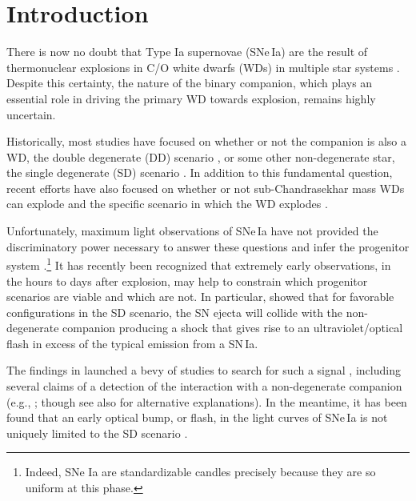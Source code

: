 \documentclass[twocolumn]{aastex63}
\begin{document}
\keywords{}

\section{Introduction}

There is now no doubt that Type Ia supernovae (SNe\,Ia) are the result of
thermonuclear explosions in C/O white dwarfs (WDs) in multiple star systems
\citep[see e.g.,][and references therein]{Maoz14}. Despite this certainty, the
nature of the binary companion, which plays an essential role in driving the
primary WD towards explosion, remains highly uncertain.

Historically, most studies have focused on whether or not the companion is
also a WD, the double degenerate (DD) scenario \citep[e.g.,][]{Webbink84}, or
some other non-degenerate star, the single degenerate (SD) scenario
\citep[e.g.,][]{Whelan73}. In addition to this fundamental question, recent
efforts have also focused on whether or not sub-Chandrasekhar mass WDs can
explode \citep[e.g.,][]{Fink10,Shen14,Scalzo14a,Polin19,Gronow20} and the
specific scenario in which the WD explodes \citep[see][and references
therein]{Hillebrandt13,Ropke18}.

Unfortunately, maximum light observations of SNe\,Ia have not provided the
discriminatory power necessary to answer these questions and infer the
progenitor system \citep[e.g.,][]{Ropke12}.\footnote{Indeed, SNe Ia are
standardizable candles precisely because they are so uniform at this phase.}
It has recently been recognized that extremely early observations, in the
hours to days after explosion, may help to constrain which progenitor
scenarios are viable and which are not. In particular, \citet{Kasen10a} showed
that for favorable configurations in the SD scenario, the SN ejecta will
collide with the non-degenerate companion producing a shock that gives rise to
an ultraviolet/optical flash in excess of the typical emission from a SN\,Ia.

The findings in \citet{Kasen10a} launched a bevy of studies to search for such
a signal \citep[e.g.,][]{Hayden10,Ganeshalingam11,Bianco11,Nugent11,Olling15},
including several claims of a detection of the interaction with a
non-degenerate companion (e.g.,
\citealt{Cao15,Marion16,Hosseinzadeh17,Dimitriadis19}; though see also
\citealt{Kromer16,Shappee18,Shappee19,Jiang18} for alternative explanations).
In the meantime, it has been found that an early optical bump, or flash, in
the light curves of SNe\,Ia is not uniquely limited to the SD scenario
\citep[e.g.,][]{Raskin13,Piro16,Levanon17,Noebauer17,Jiang17,Maeda18,Polin19,
De19,Magee20a}.
\end{document}
